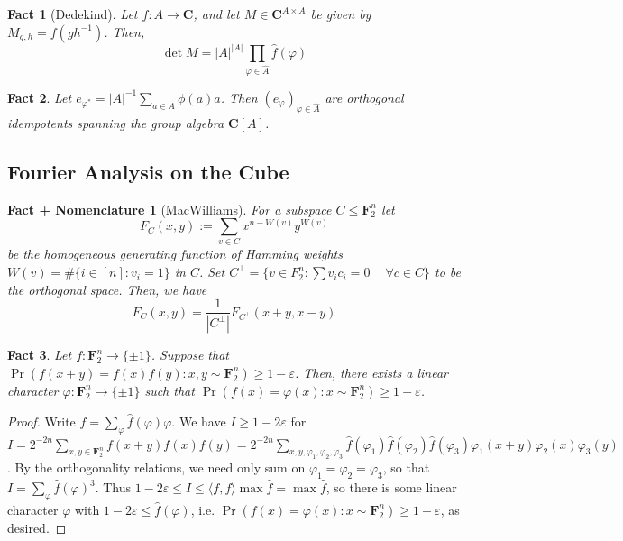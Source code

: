 \documentclass[12pt]{article}
\newtheorem*{fact*}{Fact}
\newtheorem*{fact_plus_nomn*}{Fact + Nomenclature}
\newcommand{\abs}[1]{\left\lvert#1\right\rvert}
\newcommand{\eps}{\varepsilon}
\newcommand{\gen}[1]{\langle#1\rangle}
\DeclareMathOperator{\pr}{Pr}
\newcommand{\vphi}{\varphi}
\newcommand{\C}{\mathbf{C}}
\newcommand{\F}{\mathbf{F}}
\begin{document}
\begin{fact*}[Dedekind]
Let $f:A\to \C$, and let $M\in\C^{A\times A}$ be given by $M_{g,h}=f(gh^{-1})$. Then,
\[\det M = \abs{A}^{\abs{A}}\prod_{\vphi\in\hat{A}}\hat{f}(\vphi)\]
\end{fact*}


\begin{fact*}
Let $e_{\vphi^*} = \abs{A}^{-1} \sum_{a\in A}\phi(a)a$. Then $(e_{\vphi})_{\vphi\in \hat{A}}$ are orthogonal idempotents spanning the group algebra $\C[A]$.
\end{fact*}


\subsection{Fourier Analysis on the Cube}


\begin{fact_plus_nomn*}[MacWilliams] For a subspace $C \le \F_2^n$ let \[F_C(x,y) := \sum_{v\in C} x^{n-W(v)}y^{W(v)}\]
be the homogeneous generating function of Hamming weights $W(v)=\#\{i\in[n] : v_i = 1\}$ in $C$. Set $C^\perp = \{v\in F_2^n : \sum v_ic_i = 0 \phantom{-}\forall c\in C\}$ to be the orthogonal space. Then, we have
\[F_C(x,y) = \frac{1}{\abs{C^\perp}}F_{C^\perp}(x+y,x-y)\]
\end{fact_plus_nomn*}


\begin{fact*}
Let $f:\F_2^n\to\{\pm1\}$. Suppose that $\pr(f(x+y)=f(x)f(y) : x,y\sim \F_2^n)\ge 1-\eps$. Then, there exists a linear character $\vphi : \F_2^n\to\{\pm1\}$ such that $\Pr(f(x) = \vphi(x) : x\sim\F_2^n) \ge 1-\eps$.
\end{fact*}


\begin{proof}
Write $f = \sum_{\vphi}\hat{f}(\vphi)\vphi$. We have $I\ge 1-2\eps$ for $I = 2^{-2n}\sum_{x,y\in\F_2^n} f(x+y)f(x)f(y) = 2^{-2n}\sum_{x,y,\vphi_1,\vphi_2,\vphi_3}\hat{f}(\vphi_1)\hat{f}(\vphi_2)\hat{f}(\vphi_3)\vphi_1(x+y)\vphi_2(x)\vphi_3(y)$. By the orthogonality relations, we need only sum on $\vphi_1=\vphi_2=\vphi_3$, so that $I = \sum_{\vphi} \hat{f}(\vphi)^3$. 
Thus $1-2\eps \le I \le  \gen{f,f} \max{\hat{f}} = \max{\hat{f}}$, so there is some linear character $\vphi$ with $1-2\eps \le \hat{f}(\vphi)$, i.e. $\pr(f(x)=\vphi(x) : x\sim\F_2^n) \ge 1-\eps$, as desired.
\end{proof}
\end{document}

